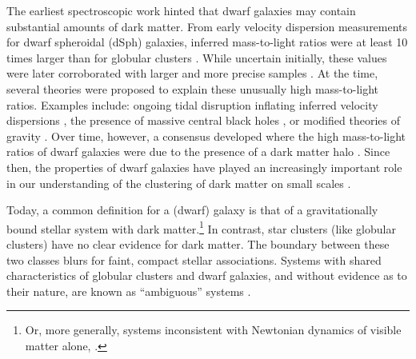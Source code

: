 The earliest spectroscopic work hinted that dwarf galaxies may contain
substantial amounts of dark matter. From early velocity dispersion
measurements for dwarf spheroidal (dSph) galaxies, inferred
mass-to-light ratios were at least 10 times larger than for globular
clusters \citep[e.g.,][]{aaronson1983, aaronson+olszewski1987}. While
uncertain initially, these values were later corroborated with larger
and more precise samples \citep[e.g.,][]{hargreaves+1994}. At the time,
several theories were proposed to explain these unusually high
mass-to-light ratios. Examples include: ongoing tidal disruption
inflating inferred velocity dispersions
\citep[e.g.,][]{kuhn+miller1989}, the presence of massive central black
holes \citep[e.g.,][]{strobel+lake1994}, or modified theories of gravity
\citep{milgrom1995}. Over time, however, a consensus developed where the
high mass-to-light ratios of dwarf galaxies were due to the presence of
a dark matter halo \citep[e.g.,][]{dekel+silk1986, wechsler+tinker2018}.
Since then, the properties of dwarf galaxies have played an increasingly
important role in our understanding of the clustering of dark matter on
small scales \citep[e.g.,][]{bullock+boylan-kolchin2017, sales+2022}.

Today, a common definition for a (dwarf) galaxy is that of a
gravitationally bound stellar system with dark matter.\footnote{Or, more
  generally, systems inconsistent with Newtonian dynamics of visible
  matter alone, \citet{willman+strader2012}.} In contrast, star clusters
(like globular clusters) have no clear evidence for dark matter. The
boundary between these two classes blurs for faint, compact stellar
associations. Systems with shared characteristics of globular clusters
and dwarf galaxies, and without evidence as to their nature, are known
as ``ambiguous'' systems \citep[e.g.,][]{smith+2024}.

